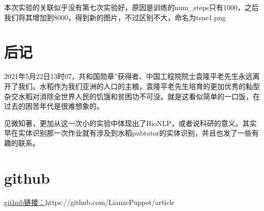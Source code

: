 \documentclass{article}
\begin{document}
本次实验的关联似乎没有第七次实验好，原因是训练的num\_steps只有1000，之后我们将其增加到8000，得到新的图片，不过区别不大，命名为tsne1.png

\section{\label{ch:postscript}后记}

2021年5月22日13时07，共和国勋章”获得者、中国工程院院士袁隆平老先生永远离开了我们。水稻作为我们亚洲的人口的主粮，袁隆平老先生培育的更加优秀的籼型杂交水稻对消除全世界人民的饥饿和贫困功不可没。就是这看似简单的一口饭，在过去的困苦年代是很难想象的。\par
见微知著，更加从这一次小的实验中体现出了BioNLP，或者说科研的意义。其实早在实体识别那一次作业就有涉及到水稻pubtator的实体识别，并且也发了一些有趣的联系。



\section{github}
\href{https://github.com/LianzePuppet/article}{\underline{github链接：}}https://github.com/LianzePuppet/article


\end{document}
